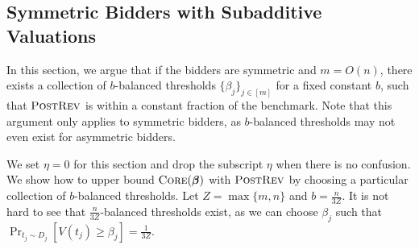 \subsection{Symmetric Bidders with Subadditive Valuations}\label{sec:symmetric subadditive}
In this section, we argue that if the bidders are symmetric and $m=O(n)$, there exists a collection of $b$-balanced thresholds $\{\beta_j\}_{j\in[m]}$ for a fixed constant $b$, such that $\textsc{PostRev}$ is within a constant fraction of the benchmark. Note that this argument only applies to symmetric bidders, as $b$-balanced thresholds may not even exist for asymmetric bidders.  %


We set $\eta=0$ for this section and drop the subscript $\eta$ when there is no confusion. %
 We show how to upper bound $\textsc{Core}(\boldsymbol{\beta})$ with $\textsc{PostRev}$ by choosing a particular collection of $b$-balanced thresholds. Let $Z=\max\{m,n\}$ and $b = \frac{n}{3Z}$. It is not hard to see that $\frac{n}{3Z}$-balanced thresholds exist, as we can choose $\beta_j$ such that $\Pr_{t_j\sim D_j}[V(t_j)\geq \beta_j]=\frac{1}{3Z}$. %

